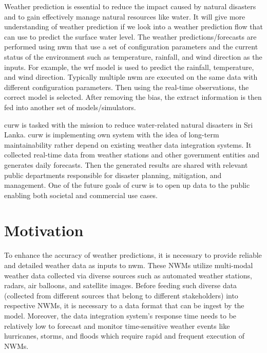 Weather prediction is essential to reduce the impact caused by natural disasters and to gain effectively manage natural resources like water. It will give more understanding of weather prediction if we look into a weather prediction flow that can use to predict the surface water level. The weather predictions/forecasts are performed using \acrfull{nwm} that use a set of configuration parameters and the current status of the environment such as temperature, rainfall, and wind direction as the inputs. For example, the \acrfull{wrf} \cite{MesoscaleMicroscaleMeteorologyLaboratoryWeatherModel} model is used to predict the rainfall, temperature, and wind direction. Typically multiple \acrshort{nwm} are executed on the same data with different configuration parameters. Then using the real-time observations, the correct model is selected. After removing the bias, the extract information is then fed into another set of models/simulators. 

\acrfull{curw} \cite{CUrWSL2017SL} is tasked with the mission to reduce water-related natural disasters in Sri Lanka. \acrshort{curw} \cite{CUrWSLObservedSL} is implementing own system with the idea of long-term maintainability rather depend on existing weather data integration systems. It collected real-time data from weather stations and other government entities and generates daily forecasts. Then the generated results are shared with relevant public departments responsible for disaster planning, mitigation, and management. One of the future goals of \acrshort{curw} is to open up data to the public enabling both societal and commercial use cases.

\section{Motivation}
To enhance the accuracy of weather predictions, it is necessary to provide reliable and detailed weather data as inputs to \acrshort{nwm}. These NWMs utilize multi-modal weather data collected via diverse sources such as automated weather stations, radars, air balloons, and satellite images. Before feeding such diverse data (collected from different sources that belong to different stakeholders) into respective NWMs, it is necessary to a data format that can be ingest by the model. Moreover, the data integration system’s response time needs to be relatively low to forecast and monitor time-sensitive weather events like hurricanes, storms, and floods which require rapid and frequent execution of NWMs.

